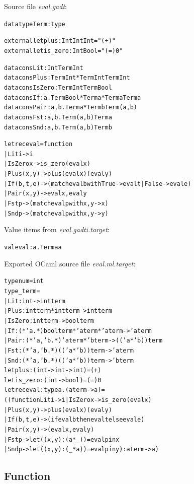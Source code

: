 \documentclass{article}
\newcommand{\tmem}[1]{{\em #1\/}}
\newcommand{\tmverbatim}[1]{{\ttfamily{#1}}}
\newenvironment{tmcode}[1][]{\begin{alltt}}{\end{alltt}}
\begin{document}
Source file {\tmem{eval.gadt}}:
\begin{tmcode}
datatype Term : type

external let plus : Int  Int  Int = "(+)"
external let is_zero : Int  Bool = "(=) 0"

datacons Lit : Int  Term Int
datacons Plus : Term Int * Term Int  Term Int
datacons IsZero : Term Int  Term Bool
datacons If : a. Term Bool * Term a * Term a  Term a
datacons Pair : a, b. Term a * Term b  Term (a, b)
datacons Fst : a, b. Term (a, b)  Term a
datacons Snd : a, b. Term (a, b)  Term b

let rec eval = function
  | Lit i -> i
  | IsZero x -> is_zero (eval x)
  | Plus (x, y) -> plus (eval x) (eval y)
  | If (b, t, e) -> (match eval b with True -> eval t | False -> eval e)
  | Pair (x, y) -> eval x, eval y
  | Fst p -> (match eval p with x, y -> x)
  | Snd p -> (match eval p with x, y -> y)
\end{tmcode}
Value items from {\tmem{eval.gadti.target}}:
\begin{tmcode}
val eval : a. Term a  a
\end{tmcode}
Exported OCaml source file {\tmem{eval.ml.target}}:
\begin{tmcode}
type num = int
type _ term =
  | Lit : int -> int term
  | Plus : int term * int term -> int term
  | IsZero : int term -> bool term
  | If : (*'a.*)bool term * 'a term * 'a term -> 'a term
  | Pair : (*'a, 'b.*)'a term * 'b term -> (('a * 'b)) term
  | Fst : (*'a, 'b.*)(('a * 'b)) term -> 'a term
  | Snd : (*'a, 'b.*)(('a * 'b)) term -> 'b term
let plus : (int -> int -> int) = (+)
let is_zero : (int -> bool) = (=) 0
let rec eval : type a . (a term -> a) =
  ((function Lit i -> i | IsZero x -> is_zero (eval x)
    | Plus (x, y) -> plus (eval x) (eval y)
    | If (b, t, e) -> (if eval b then eval t else eval e)
    | Pair (x, y) -> (eval x, eval y)
    | Fst p -> let ((x, y): (a * _)) = eval p in x
    | Snd p -> let ((x, y): (_ * a)) = eval p in y): a term -> a)
\end{tmcode}

\subsection{Function \tmverbatim{equal}}
\end{document}
